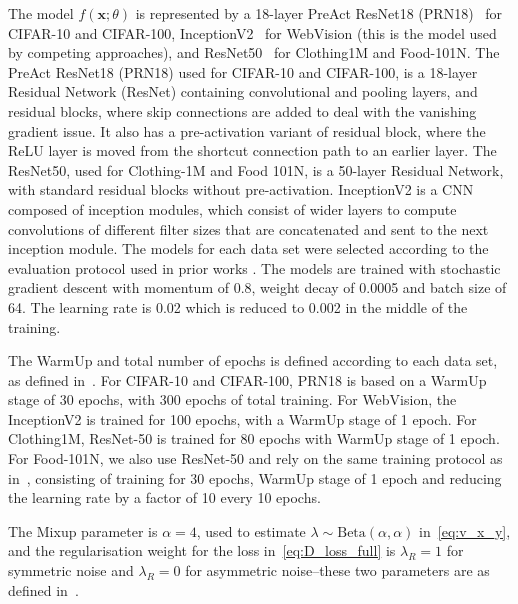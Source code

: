 \documentclass[review]{elsarticle}
\begin{document}
The model $f(\mathbf{x};\theta)$ is represented by a 18-layer PreAct ResNet18 (PRN18)~\cite{he2016identity} 
 for CIFAR-10 and CIFAR-100, InceptionV2~\cite{szegedy2017inception} for WebVision (this is the model used by competing approaches), and ResNet50~\cite{he2016deep} for Clothing1M and Food-101N. The  PreAct ResNet18 (PRN18) used for CIFAR-10 and CIFAR-100, is a 18-layer Residual Network (ResNet) containing convolutional and pooling layers, and residual blocks, where skip connections are added to deal with the vanishing gradient issue. It also has a pre-activation variant of residual block, where the ReLU layer is moved from the shortcut connection path to an earlier layer. The ResNet50, used for Clothing-1M and Food 101N, is a 50-layer Residual Network,  with standard residual blocks without pre-activation. InceptionV2 is a CNN composed of inception modules, which consist of wider layers to compute convolutions of different filter sizes that are concatenated and sent to the next inception module. The models for each data set were selected according to the evaluation protocol used in prior works \cite{li2020dividemix, li2019learning, arazo2019unsupervised, yu2019does, xiao2015learning}. 
The models are trained with stochastic gradient descent with momentum of 0.8, weight decay of 0.0005 and batch size of 64. The learning rate is 0.02 which is reduced to 0.002 in the middle of the training. 

The WarmUp and total number of epochs is defined according to each data set, as defined in~\cite{li2020dividemix}.
For CIFAR-10 and CIFAR-100, PRN18 is based on a WarmUp stage of 30 epochs, with 300 epochs of total training.
For WebVision, the InceptionV2 is trained for 100 epochs, with a WarmUp stage of 1 epoch.
For Clothing1M, ResNet-50 is trained for 80 epochs with WarmUp stage of 1 epoch.
For Food-101N, we also use ResNet-50 and rely on the same training protocol as in~\cite{han2019deep}, consisting of training for 30 epochs, WarmUp stage of 1 epoch and reducing the learning rate by a factor of 10 every 10 epochs.



The Mixup parameter is $\alpha=4$, used to estimate $\lambda \sim \text{Beta}(\alpha,\alpha)$ in~\eqref{eq:v_x_y}, and 
the regularisation weight for the loss in~\eqref{eq:D_loss_full} is $\lambda_{R}=1$ for symmetric noise and $\lambda_{R}=0$ for asymmetric noise--these two parameters are as defined in~\cite{li2020dividemix}. 
\end{document}
